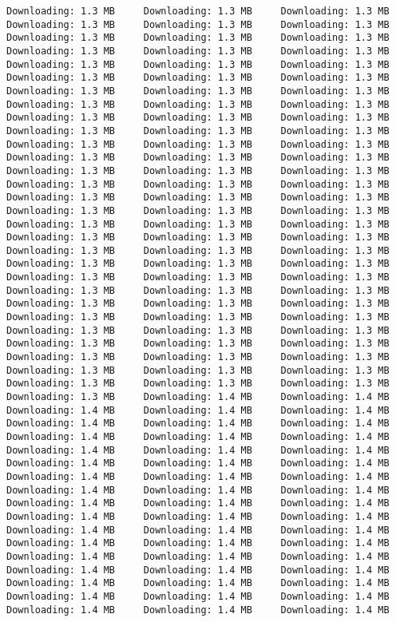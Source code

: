 \documentclass[
  12pt,
]{report}
\begin{document}
\begin{verbatim}
Downloading: 1.3 MB     Downloading: 1.3 MB     Downloading: 1.3 MB     Downloading: 1.3 MB     Downloading: 1.3 MB     Downloading: 1.3 MB     Downloading: 1.3 MB     Downloading: 1.3 MB     Downloading: 1.3 MB     Downloading: 1.3 MB     Downloading: 1.3 MB     Downloading: 1.3 MB     Downloading: 1.3 MB     Downloading: 1.3 MB     Downloading: 1.3 MB     Downloading: 1.3 MB     Downloading: 1.3 MB     Downloading: 1.3 MB     Downloading: 1.3 MB     Downloading: 1.3 MB     Downloading: 1.3 MB     Downloading: 1.3 MB     Downloading: 1.3 MB     Downloading: 1.3 MB     Downloading: 1.3 MB     Downloading: 1.3 MB     Downloading: 1.3 MB     Downloading: 1.3 MB     Downloading: 1.3 MB     Downloading: 1.3 MB     Downloading: 1.3 MB     Downloading: 1.3 MB     Downloading: 1.3 MB     Downloading: 1.3 MB     Downloading: 1.3 MB     Downloading: 1.3 MB     Downloading: 1.3 MB     Downloading: 1.3 MB     Downloading: 1.3 MB     Downloading: 1.3 MB     Downloading: 1.3 MB     Downloading: 1.3 MB     Downloading: 1.3 MB     Downloading: 1.3 MB     Downloading: 1.3 MB     Downloading: 1.3 MB     Downloading: 1.3 MB     Downloading: 1.3 MB     Downloading: 1.3 MB     Downloading: 1.3 MB     Downloading: 1.3 MB     Downloading: 1.3 MB     Downloading: 1.3 MB     Downloading: 1.3 MB     Downloading: 1.3 MB     Downloading: 1.3 MB     Downloading: 1.3 MB     Downloading: 1.3 MB     Downloading: 1.3 MB     Downloading: 1.3 MB     Downloading: 1.3 MB     Downloading: 1.3 MB     Downloading: 1.3 MB     Downloading: 1.3 MB     Downloading: 1.3 MB     Downloading: 1.3 MB     Downloading: 1.3 MB     Downloading: 1.3 MB     Downloading: 1.3 MB     Downloading: 1.3 MB     Downloading: 1.3 MB     Downloading: 1.3 MB     Downloading: 1.3 MB     Downloading: 1.3 MB     Downloading: 1.3 MB     Downloading: 1.3 MB     Downloading: 1.3 MB     Downloading: 1.3 MB     Downloading: 1.3 MB     Downloading: 1.3 MB     Downloading: 1.3 MB     Downloading: 1.3 MB     Downloading: 1.3 MB     Downloading: 1.3 MB     Downloading: 1.3 MB     Downloading: 1.3 MB     Downloading: 1.3 MB     Downloading: 1.3 MB     Downloading: 1.4 MB     Downloading: 1.4 MB     Downloading: 1.4 MB     Downloading: 1.4 MB     Downloading: 1.4 MB     Downloading: 1.4 MB     Downloading: 1.4 MB     Downloading: 1.4 MB     Downloading: 1.4 MB     Downloading: 1.4 MB     Downloading: 1.4 MB     Downloading: 1.4 MB     Downloading: 1.4 MB     Downloading: 1.4 MB     Downloading: 1.4 MB     Downloading: 1.4 MB     Downloading: 1.4 MB     Downloading: 1.4 MB     Downloading: 1.4 MB     Downloading: 1.4 MB     Downloading: 1.4 MB     Downloading: 1.4 MB     Downloading: 1.4 MB     Downloading: 1.4 MB     Downloading: 1.4 MB     Downloading: 1.4 MB     Downloading: 1.4 MB     Downloading: 1.4 MB     Downloading: 1.4 MB     Downloading: 1.4 MB     Downloading: 1.4 MB     Downloading: 1.4 MB     Downloading: 1.4 MB     Downloading: 1.4 MB     Downloading: 1.4 MB     Downloading: 1.4 MB     Downloading: 1.4 MB     Downloading: 1.4 MB     Downloading: 1.4 MB     Downloading: 1.4 MB     Downloading: 1.4 MB     Downloading: 1.4 MB     Downloading: 1.4 MB     Downloading: 1.4 MB     Downloading: 1.4 MB     Downloading: 1.4 MB     Downloading: 1.4 MB     Downloading: 1.4 MB     Downloading: 1.4 MB     Downloading: 1.4 MB     
\end{verbatim}
\end{document}

